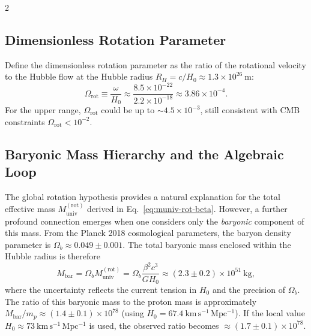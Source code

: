 \documentclass[12pt,a4paper]{article}
\newcommand{\Omegarot}{\Omega_{\mathrm{rot}}}
\begin{document}
\begin{multicols}{2}
		\subsection{Dimensionless Rotation Parameter}
		
		Define the dimensionless rotation parameter as the ratio of the rotational velocity to the Hubble flow at the Hubble radius \(R_H = c/H_0 \approx 1.3\times10^{26}\ \text{m}\):
		\begin{equation}
			\Omegarot \equiv \frac{\omega}{H_0} \approx \frac{8.5\times10^{-22}}{2.2\times10^{-18}} \approx 3.86\times10^{-4}.
		\end{equation}
		For the upper range, \(\Omegarot\) could be up to \(\sim 4.5\times10^{-3}\), still consistent with CMB constraints \(\Omegarot < 10^{-2}\).
		
		\subsection{Baryonic Mass Hierarchy and the Algebraic Loop}
		\label{subsec:baryon-hierarchy}
		
		The global rotation hypothesis provides a natural explanation for the total effective mass \(M_{\mathrm{univ}}^{\mathrm{(rot)}}\) derived in Eq.~\eqref{eq:muniv-rot-beta}. However, a further profound connection emerges when one considers only the \emph{baryonic} component of this mass. From the Planck 2018 cosmological parameters, the baryon density parameter is \(\Omega_b \approx 0.049 \pm 0.001\). The total baryonic mass enclosed within the Hubble radius is therefore
		\begin{equation}
			M_{\mathrm{bar}} = \Omega_b M_{\mathrm{univ}}^{\mathrm{(rot)}} = \Omega_b \frac{\beta^2 c^3}{G H_0} \approx (2.3 \pm 0.2) \times 10^{51}\ \mathrm{kg},
		\end{equation}
		where the uncertainty reflects the current tension in \(H_0\) and the precision of \(\Omega_b\). The ratio of this baryonic mass to the proton mass is approximately \(M_{\mathrm{bar}}/m_p \approx (1.4 \pm 0.1) \times 10^{78}\) (using \(H_0 = 67.4\ \mathrm{km\,s^{-1}\,Mpc^{-1}}\)). If the local value \(H_0 \approx 73\ \mathrm{km\,s^{-1}\,Mpc^{-1}}\) is used, the observed ratio becomes \(\approx (1.7 \pm 0.1) \times 10^{78}\).
		

\end{multicols}
\end{document}
